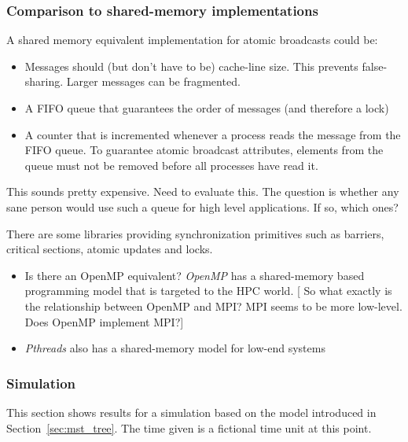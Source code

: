 \documentclass{article}
\newcommand{\stefan}[1]{
  {\color{skRed}[{\color{red}{SK}} #1]}}
\begin{document}
\subsubsection{Comparison to shared-memory implementations}

A shared memory equivalent implementation for atomic broadcasts could
be:
\begin{itemize}
\item Messages should (but don't have to be) cache-line size. This
  prevents false-sharing. Larger messages can be fragmented. 
\item A FIFO queue that guarantees the order of messages (and therefore
  a lock)
\item A counter that is incremented whenever a process reads the
  message from the FIFO queue. To guarantee atomic broadcast
  attributes, elements from the queue must not be removed before all
  processes have read it.
\end{itemize}

This sounds pretty expensive. Need to evaluate this. The question is
whether any sane person would use such a queue for high level
applications. If so, which ones?

There are some libraries providing synchronization primitives such as
barriers, critical sections, atomic updates and locks.

\begin{itemize}
\item Is there an OpenMP equivalent? \emph{OpenMP} has a shared-memory
  based programming model that is targeted to the HPC
  world. \stefan{So what exactly is the relationship between OpenMP
    and MPI? MPI seems to be more low-level. Does OpenMP implement
    MPI?}
\item \emph{Pthreads} also has a shared-memory model for low-end
  systems~\cite{OpenMP_paper}
\end{itemize}

\subsubsection{Simulation}

This section shows results for a simulation based on the model
introduced in Section~\ref{sec:mst_tree}. The time given is a
fictional time unit at this point.
\end{document}
